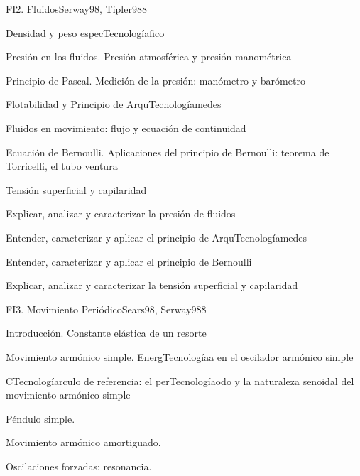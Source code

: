 \begin{syllabus}
\begin{unit}{FI2. Fluidos}{Serway98, Tipler98}{8}
\begin{topics}
         \item  Densidad y peso especTecnologíafico
	 \item  Presión en los fluidos. Presión atmosférica y presión manométrica
         \item  Principio de Pascal. Medición de la presión: manómetro y barómetro
	 \item  Flotabilidad y Principio de ArquTecnologíamedes
         \item  Fluidos en movimiento: flujo y ecuación de continuidad
	 \item  Ecuación de Bernoulli. Aplicaciones del principio de Bernoulli: teorema de Torricelli, el tubo ventura
         \item  Tensión superficial y capilaridad
   \end{topics}

   \begin{unitgoals}
         \item  Explicar, analizar y caracterizar la presión de fluidos
         \item  Entender, caracterizar y aplicar el principio de ArquTecnologíamedes
         \item  Entender, caracterizar y aplicar el principio de Bernoulli
         \item  Explicar, analizar y caracterizar la tensión superficial y capilaridad
   \end{unitgoals}
\end{unit}

\begin{unit}{FI3. Movimiento Periódico}{Sears98, Serway98}{8}
\begin{topics}
         \item  Introducción. Constante elástica de un resorte
	 \item  Movimiento armónico simple. EnergTecnologíaa en el oscilador armónico simple
         \item  CTecnologíarculo de referencia: el perTecnologíaodo y la naturaleza senoidal del movimiento armónico simple
	 \item  Péndulo simple.
         \item  Movimiento armónico amortiguado.
         \item  Oscilaciones forzadas: resonancia.
   \end{topics}


\end{unit}
\end{syllabus}
